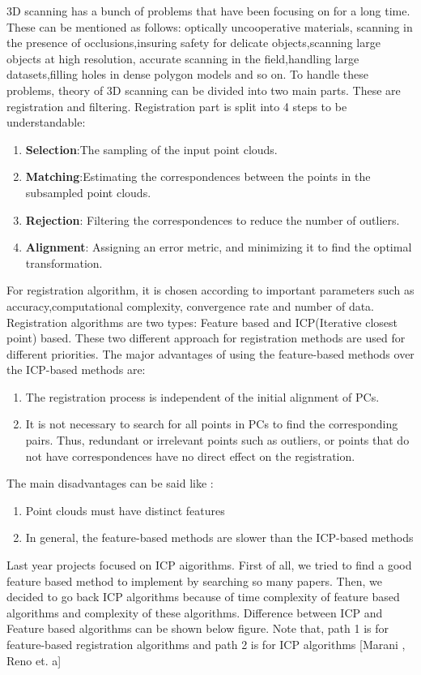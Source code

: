 \documentclass[aps,letterpaper,11pt]{revtex4}
\begin{document}
3D scanning has a bunch of problems that have been focusing on for a long time. These can be mentioned as follows: optically uncooperative materials, scanning in the presence of occlusions,insuring safety for delicate objects,scanning large objects at high resolution, accurate scanning in the field,handling large datasets,filling holes in dense polygon models  and so on. To handle these problems, theory of 3D scanning can be divided into two main parts. These are registration and filtering. Registration part is split into 4 steps to be understandable:
\begin{enumerate}
  \item \textbf{Selection}:The sampling of the input point clouds.
 \item \textbf{Matching}:Estimating the correspondences between the points in the subsampled point clouds.
  \item \textbf{Rejection}: Filtering the correspondences to reduce the number of outliers.
\item \textbf{Alignment}: Assigning an error metric, and minimizing it to find the optimal transformation.
\end{enumerate}
For registration algorithm, it is chosen according to important parameters such as accuracy,computational complexity, convergence rate and number of data. Registration algorithms are two types: Feature based and ICP(Iterative closest point) based. These two different approach for registration methods are used for different priorities. The major advantages of using the feature-based methods over the ICP-based methods are: 
\begin{enumerate}
\item The registration process is independent of the initial
alignment of PCs.
\item  It is not necessary to search for all points in PCs to find the corresponding pairs. Thus, redundant or irrelevant points such as outliers, or points that do not have correspondences have no direct effect on the registration.
\end{enumerate}
The main disadvantages can be said like :
\begin{enumerate}
\item Point clouds  must have distinct features
\item In general, the feature-based methods are slower than
the ICP-based methods
\end{enumerate}
Last year projects focused on ICP aigorithms. First of all, we tried to find a good feature based method to implement by searching so many papers. Then, we decided to go back ICP algorithms because of time complexity of feature based algorithms and complexity of these algorithms. Difference between ICP and Feature based algorithms can be shown below figure. Note that, path 1 is for feature-based registration algorithms and path 2 is for ICP algorithms  [Marani , Reno et. a]
\end{document}
